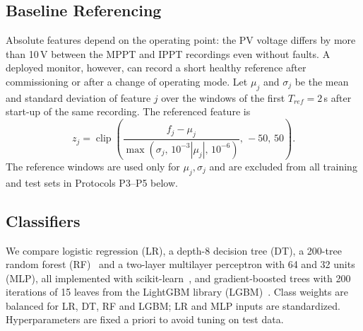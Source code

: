 \documentclass[conference]{IEEEtran}
\begin{document}
\subsection{Baseline Referencing}
Absolute features depend on the operating point: the PV voltage differs by more than 10\,V between the MPPT and IPPT recordings even without faults. A deployed monitor, however, can record a short healthy reference after commissioning or after a change of operating mode. Let $\mu_j$ and $\sigma_j$ be the mean and standard deviation of feature $j$ over the windows of the first $T_{ref}=2$\,s after start-up of the same recording. The referenced feature is
\begin{equation}
z_j=\operatorname{clip}\!\left(\frac{f_j-\mu_j}{\max(\sigma_j,\,10^{-3}|\mu_j|,\,10^{-6})},\,-50,\,50\right).
\label{eq:ref}
\end{equation}
The reference windows are used only for $\mu_j,\sigma_j$ and are excluded from all training and test sets in Protocols P3--P5 below.

\subsection{Classifiers}
We compare logistic regression (LR), a depth-8 decision tree (DT), a 200-tree random forest (RF)~\cite{breiman2001rf} and a two-layer multilayer perceptron with 64 and 32 units (MLP), all implemented with scikit-learn~\cite{pedregosa2011sklearn}, and gradient-boosted trees with 200 iterations of 15 leaves from the LightGBM library (LGBM)~\cite{ke2017lightgbm}. Class weights are balanced for LR, DT, RF and LGBM; LR and MLP inputs are standardized. Hyperparameters are fixed a priori to avoid tuning on test data.
\end{document}
